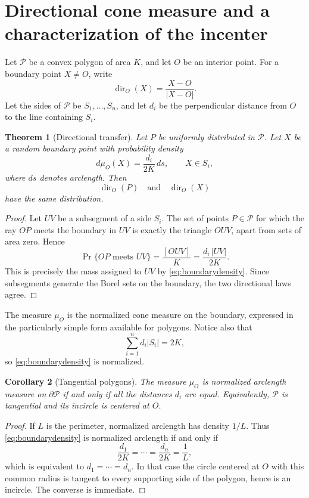 \documentclass[11pt]{article}
\newtheorem{theorem}{Theorem}[section]
\newtheorem{corollary}[theorem]{Corollary}
\theoremstyle{definition}
\theoremstyle{remark}
\begin{document}
\section{Directional cone measure and a characterization of the incenter}
\label{sec:cone}

Let $\mathcal P$ be a convex polygon of area $K$, and let $O$ be an interior point.  For a boundary point $X\ne O$, write
\[
\operatorname{dir}_O(X)=\frac{X-O}{|X-O|}.
\]
Let the sides of $\mathcal P$ be $S_1,\dots,S_n$, and let $d_i$ be the perpendicular distance from $O$ to the line containing $S_i$.

\begin{theorem}[Directional transfer]
\label{thm:transfer}
Let $P$ be uniformly distributed in $\mathcal P$.  Let $X$ be a random boundary point with probability density
\begin{equation}
\label{eq:boundarydensity}
 d\mu_O(X)=\frac{d_i}{2K}\,ds,
 \qquad X\in S_i,
\end{equation}
where $ds$ denotes arclength.  Then
\[
\operatorname{dir}_O(P)
\quad\text{and}\quad
\operatorname{dir}_O(X)
\]
have the same distribution.
\end{theorem}

\begin{proof}
Let $UV$ be a subsegment of a side $S_i$.  The set of points $P\in\mathcal P$ for which the ray $OP$ meets the boundary in $UV$ is exactly the triangle $OUV$, apart from sets of area zero.  Hence
\[
\Pr\{OP\text{ meets }UV\}
=\frac{[OUV]}K
=\frac{d_i\,|UV|}{2K}.
\]
This is precisely the mass assigned to $UV$ by \eqref{eq:boundarydensity}.  Since subsegments generate the Borel sets on the boundary, the two directional laws agree.
\end{proof}

The measure $\mu_O$ is the normalized cone measure on the boundary, expressed in the particularly simple form available for polygons.  Notice also that
\[
\sum_{i=1}^n d_i|S_i|=2K,
\]
so \eqref{eq:boundarydensity} is normalized.

\begin{corollary}[Tangential polygons]
\label{cor:tangential}
The measure $\mu_O$ is normalized arclength measure on $\partial\mathcal P$ if and only if all the distances $d_i$ are equal.  Equivalently, $\mathcal P$ is tangential and its incircle is centered at $O$.
\end{corollary}

\begin{proof}
If $L$ is the perimeter, normalized arclength has density $1/L$.  Thus \eqref{eq:boundarydensity} is normalized arclength if and only if
\[
\frac{d_1}{2K}=\cdots=\frac{d_n}{2K}=\frac1L,
\]
which is equivalent to $d_1=\cdots=d_n$.  In that case the circle centered at $O$ with this common radius is tangent to every supporting side of the polygon, hence is an incircle.  The converse is immediate.
\end{proof}
\end{document}
